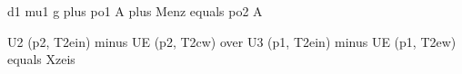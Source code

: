 d1 mu1 g plus po1 A plus Menz equals po2 A

U2 (p2, T2ein) minus UE (p2, T2cw) over U3 (p1, T2ein) minus UE (p1, T2ew) equals Xzeis